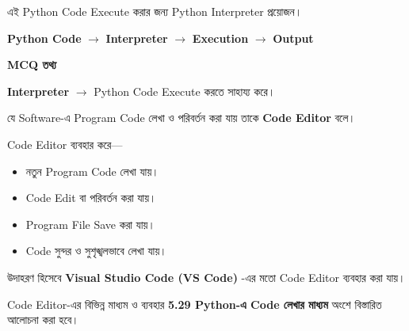 এই Python Code Execute করার জন্য Python Interpreter প্রয়োজন।

\begin{center}

\textbf{Python Code}
\(\longrightarrow\)
\textbf{Interpreter}
\(\longrightarrow\)
\textbf{Execution}
\(\longrightarrow\)
\textbf{Output}

\end{center}

\begin{rememberbox}

\textbf{\color{deepOrange}MCQ তথ্য}

\textbf{Interpreter}
\(\longrightarrow\)
Python Code Execute করতে সাহায্য করে।

\end{rememberbox}



যে Software-এ Program Code লেখা ও পরিবর্তন করা যায় তাকে
\textbf{Code Editor} বলে।

Code Editor ব্যবহার করে—

\begin{itemize}

\item নতুন Program Code লেখা যায়।

\item Code Edit বা পরিবর্তন করা যায়।

\item Program File Save করা যায়।

\item Code সুন্দর ও সুশৃঙ্খলভাবে লেখা যায়।

\end{itemize}

উদাহরণ হিসেবে
\textbf{Visual Studio Code (VS Code)}
-এর মতো Code Editor ব্যবহার করা যায়।

\begin{rememberbox}

Code Editor-এর বিভিন্ন মাধ্যম ও ব্যবহার
\textbf{5.29 Python-এ Code লেখার মাধ্যম}
অংশে বিস্তারিত আলোচনা করা হবে।

\end{rememberbox}




